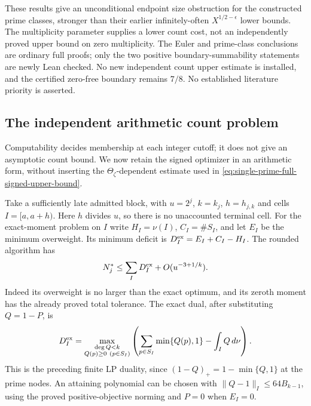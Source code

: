 \documentclass[11pt]{article}
\theoremstyle{definition}
\begin{document}
These results give an unconditional endpoint size obstruction
for the constructed prime classes, stronger than their earlier
infinitely-often $X^{1/2-\epsilon}$ lower bounds.
The multiplicity parameter supplies a lower count cost,
not an independently proved upper bound on zero multiplicity.
The Euler and prime-class conclusions are ordinary full proofs;
only the two positive boundary-summability statements are newly
Lean checked. No new independent count upper estimate is
installed, and the certified zero-free boundary remains $7/8$.
No established literature priority is asserted.

\subsection{The independent arithmetic count problem}
\label{sec:independent-computable-prime-count}

Computability decides membership at each integer cutoff; it does
not give an asymptotic count bound. We now retain the signed
optimizer in an arithmetic form, without inserting the
$\Theta_\zeta$-dependent estimate used in
\eqref{eq:single-prime-full-signed-upper-bound}.

Take a sufficiently late admitted block, with $u=2^j$,
$k=k_j$, $h=h_{j,k}$ and cells $I=[a,a+h)$.
Here $h$ divides $u$, so there is no unaccounted terminal cell.
For the exact-moment problem on $I$ write $H_I=\nu(I)$,
$C_I=\#S_I$, and let $E_I$ be the minimum overweight.
Its minimum deficit is $D_I^{\rm ex}=E_I+C_I-H_I$.
The rounded algorithm has
\begin{equation}
 N_j^*\le\sum_I D_I^{\rm ex}+O(u^{-3+1/k}).
 \label{eq:independent-count-exact-consumer}
\end{equation}
Indeed its overweight is no larger than the exact optimum,
and its zeroth moment has the already proved total tolerance.
The exact dual, after substituting $Q=1-P$, is
\begin{equation}
 D_I^{\rm ex}
 =\max_{\substack{\deg Q<k\\Q(p)\ge0\ (p\in S_I)}}
       \left(\sum_{p\in S_I}\min\{Q(p),1\}
                                    -\int_I Q\,d\nu\right).
 \label{eq:independent-count-deficit-dual}
\end{equation}
This is the preceding finite LP duality, since
$(1-Q)_+=1-\min\{Q,1\}$ at the prime nodes.
An attaining polynomial can be chosen with
$\|Q-1\|_I\le64B_{k-1}$, using the proved positive-objective
norming and $P=0$ when $E_I=0$.
\end{document}
